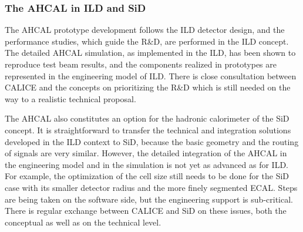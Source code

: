 \subsubsection{The AHCAL in ILD and SiD}
The AHCAL prototype development follows the ILD detector design, and the performance studies, which guide the R\&D, are performed in the ILD concept. The detailed AHCAL simulation, as implemented in the ILD, has been shown to reproduce test beam results, and the components realized in prototypes are represented in the engineering model of ILD. There is close consultation between CALICE and the concepts on prioritizing the R\&D which is still needed on the way to a realistic technical proposal.

The AHCAL also constitutes an option for the hadronic calorimeter of the SiD concept. It is straightforward to transfer the technical and integration solutions developed in the ILD context to SiD, because the basic geometry and the routing of signals are very similar. However, the detailed integration of the AHCAL in the engineering model and in the simulation is not yet as advanced as for ILD. For example, the optimization of the cell size still needs to be done for the SiD case with its smaller detector radius and the more finely segmented ECAL. Steps are being taken on the software side, but the engineering support is sub-critical. There is regular exchange between CALICE and SiD on these issues, both the conceptual as well as on the technical level.
